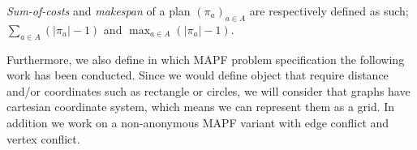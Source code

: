 \textit{Sum-of-costs} and \textit{makespan} of a plan $(\pi_a)_{a\in A}$ are respectively defined as such; $\sum_{a\in A} (|\pi_a| - 1)$ and $\max_{a\in A} (|\pi_a| - 1)$.


Furthermore, we also define in which MAPF problem specification the following work has been conducted. Since we would define object that require distance and/or coordinates such as rectangle or circles, we will consider that graphs have cartesian coordinate system, which means we can represent them as a grid. In addition we work on a non-anonymous MAPF variant with edge conflict and vertex conflict. 




